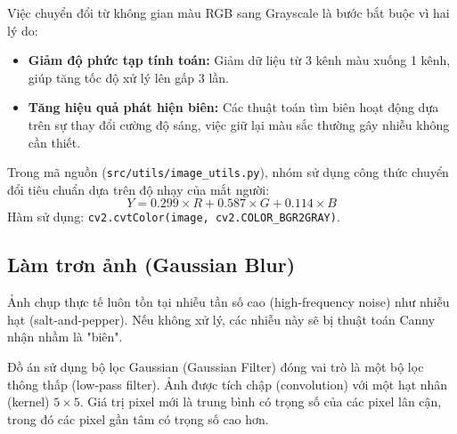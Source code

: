 \documentclass[6pt, a4paper]{report}
\begin{document}
	Việc chuyển đổi từ không gian màu RGB sang Grayscale là bước bắt buộc vì hai lý do:
	\begin{itemize}
		\item \textbf{Giảm độ phức tạp tính toán:} Giảm dữ liệu từ 3 kênh màu xuống 1 kênh, giúp tăng tốc độ xử lý lên gấp 3 lần.
		\item \textbf{Tăng hiệu quả phát hiện biên:} Các thuật toán tìm biên hoạt động dựa trên sự thay đổi cường độ sáng, việc giữ lại màu sắc thường gây nhiễu không cần thiết.
	\end{itemize}
	
	Trong mã nguồn (\texttt{src/utils/image\_utils.py}), nhóm sử dụng công thức chuyển đổi tiêu chuẩn dựa trên độ nhạy của mắt người:
	\begin{equation}
		Y = 0.299 \times R + 0.587 \times G + 0.114 \times B
	\end{equation}
	Hàm sử dụng: \texttt{cv2.cvtColor(image, cv2.COLOR\_BGR2GRAY)}.
	
	\subsection{Làm trơn ảnh (Gaussian Blur)}
	Ảnh chụp thực tế luôn tồn tại nhiễu tần số cao (high-frequency noise) như nhiễu hạt (salt-and-pepper). Nếu không xử lý, các nhiễu này sẽ bị thuật toán Canny nhận nhầm là "biên".
	
	Đồ án sử dụng bộ lọc Gaussian (Gaussian Filter) đóng vai trò là một bộ lọc thông thấp (low-pass filter). Ảnh được tích chập (convolution) với một hạt nhân (kernel) $5 \times 5$. Giá trị pixel mới là trung bình có trọng số của các pixel lân cận, trong đó các pixel gần tâm có trọng số cao hơn.
	
\end{document}
